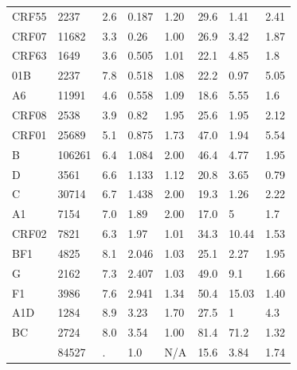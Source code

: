 \documentclass[utf8]{FrontiersinHarvard} %
\begin{document}
\begin{table}[h]
\begin{small}
\begin{tabular}{llllllll}
			CRF55                          & 2237  & 2.6    & 0.187                         & 1.20     & 29.6          & 1.41   & 2.41 \\ CRF07 & 11682 & 3.3  &
			0.26                           & 1.00  & 26.9   & 3.42                          & 1.87                                     \\ CRF63 & 1649                    & 3.6 & 0.505 & 1.01 & 22.1 &
			4.85                           & 1.8                                                                                       \\ 01B & 2237 & 7.8 & 0.518 & 1.08 & 22.2 & 0.97 & 5.05 \\ A6    &
			11991                          & 4.6   & 0.558  & 1.09                          & 18.6     & 5.55          & 1.6           \\ CRF08 & 2538 & 3.9  & 0.82                     &
			1.95                           & 25.6  & 1.95   & 2.12                                                                     \\ CRF01 & 25689 & 5.1 & 0.875 & 1.73 & 47.0 & 1.94 &
			5.54                                                                                                                       \\ B & 106261 & 6.4 & 1.084 & 2.00 & 46.4 & 4.77 & 1.95 \\ D & 3561  & 6.6
			                               & 1.133 & 1.12   & 20.8                          & 3.65     & 0.79                          \\ C    & 30714                    & 6.7 & 1.438 & 2.00 & 19.3 &
			1.26                           & 2.22                                                                                      \\ A1 & 7154 & 7.0 & 1.89 & 2.00 & 17.0 & 5 & 1.7 \\ CRF02 & 7821 &
			6.3                            & 1.97  & 1.01   & 34.3                          & 10.44    & 1.53                          \\ BF1  & 4825 & 8.1                      & 2.046 & 1.03 &
			25.1                           & 2.27  & 1.95                                                                              \\ G & 2162 & 7.3 & 2.407 & 1.03 & 49.0 & 9.1 & 1.66\\ F1   &
			3986                           & 7.6   & 2.941  & 1.34                          & 50.4     & 15.03         & 1.40          \\ A1D  & 1284 & 8.9 & 3.23                    &
			1.70                           & 27.5  & 1      & 4.3                                                                      \\ BC & 2724 & 8.0 & 3.54 & 1.00 & 81.4 & 71.2 & 1.32 \\
			\hline \citet{Wertheim:2014aa} & 84527 & .      & 1.0                           & N/A      & 15.6          & 3.84   & 1.74 \\
			\hline

			\hline
		\end{tabular}
	\end{small}
\end{table}
\end{document}
